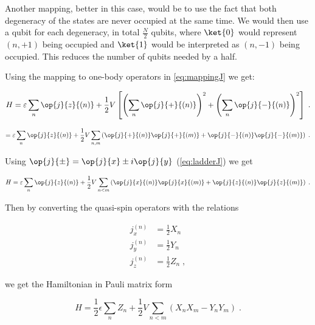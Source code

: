 Another mapping, better in this case, would be to use the fact that both degeneracy of the states are never occupied at the same time. We would then use a qubit for each degeneracy, in total $\frac{N}{2}$ qubits, where $\ket{0}$ would represent $(n, +1)$ being occupied and $\ket{1}$ would be interpreted as $(n, -1)$ being occupied. This reduces the number of qubits needed by a half. 

Using the mapping to one-body operators in \ref{eq:mappingJ} we get:

\begin{equation}
H = \varepsilon\sum_{n}\op{j}{z}{(n)} + \frac{1}{2}V\left[\left(\sum_n\op{j}{+}{(n)}\right)^2+\left(\sum_n \op{j}{-}{(n)}\right)^2\right] \; .
\end{equation}

\begin{equation}
= \varepsilon\sum_{n}\op{j}{z}{(n)} + \frac{1}{2}V \sum_{n,m}\left (\op{j}{+}{(n)}\op{j}{+}{(m)}+ \op{j}{-}{(n)}\op{j}{-}{(m)}\right ) \; .
\end{equation}

Using $\op{j}{\pm} = \op{j}{x} \pm i\op{j}{y}$ (\ref{eq:ladderJ}) we get

\begin{equation}
H = \varepsilon\sum_{n}\op{j}{z}{(n)} + \frac{1}{2}V \sum_{n < m}\left (\op{j}{x}{(n)}\op{j}{x}{(m)}+ \op{j}{z}{(n)}\op{j}{z}{(m)}\right ) \; .
\end{equation}

Then by converting the quasi-spin operators with the relations

\begin{align}
    j_x^{(n)} &= \frac{1}{2} X_n \\
    j_y^{(n)} &= \frac{1}{2} Y_n\\
    j_z^{(n)} &= \frac{1}{2} Z_n \; ,
\end{align}

we get the Hamiltonian in Pauli matrix form

\begin{equation}
    H=\frac{1}{2}\epsilon\sum_{n}Z_n+\frac{1}{2}V\sum_{n < m}(X_nX_m-Y_nY_m) \; .
\end{equation}

